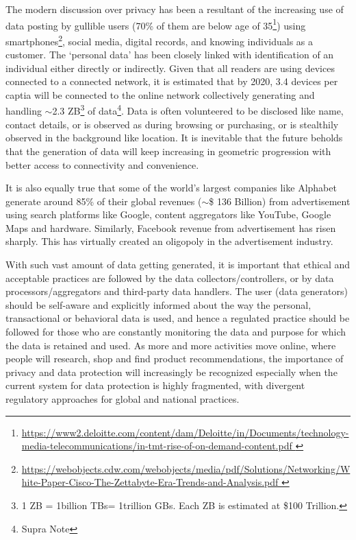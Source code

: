 \begin{multicols}{2}
The modern discussion over privacy has been a resultant of the increasing use of data posting by gullible users (70\% of them are below age of 35\footnote{\url{https://www2.deloitte.com/content/dam/Deloitte/in/Documents/technology-media-telecommunications/in-tmt-rise-of-on-demand-content.pdf }}) using smartphones\footnote{\url{https://webobjects.cdw.com/webobjects/media/pdf/Solutions/Networking/White-Paper-Cisco-The-Zettabyte-Era-Trends-and-Analysis.pdf }}, social media, digital records, and knowing individuals as a customer. The ‘personal data’ has been closely linked with identification of an individual either directly or indirectly. Given that all readers are using devices connected to a connected network, it is estimated that by 2020, 3.4 devices per captia will be connected to the online network collectively generating and handling $\sim$2.3 ZB\footnote{1 ZB = 1billion TBs= 1trillion GBs. Each ZB is estimated at \$100 Trillion.} of data\footnote{Supra Note}. Data is often volunteered to be disclosed like name, contact details, or is observed as during browsing or purchasing, or is stealthily observed in the background like location. It is inevitable that the future beholds that the generation of data will keep increasing in geometric progression with better access to connectivity and convenience.

It is also equally true that some of the world's largest companies like Alphabet generate around 85\% of their global revenues ($\sim$\$ 136 Billion) from advertisement using search platforms like Google, content aggregators like YouTube, Google Maps and hardware. Similarly, Facebook revenue from advertisement has risen sharply. This has virtually created an oligopoly in the advertisement industry.

With such vast amount of data getting generated, it is important that ethical and acceptable practices are followed by the data collectors/controllers, or by data processors/aggregators and third-party data handlers. The user (data generators) should be self-aware and explicitly informed about the way the personal, transactional or behavioral data is used, and hence a regulated practice should be followed for those who are constantly monitoring the data and purpose for which the data is retained and used. As more and more activities move online, where people will research, shop and find product recommendations, the importance of privacy and data protection will  increasingly be recognized especially when the current system for data protection is highly fragmented, with divergent regulatory approaches for global and national practices. 


\end{multicols}
